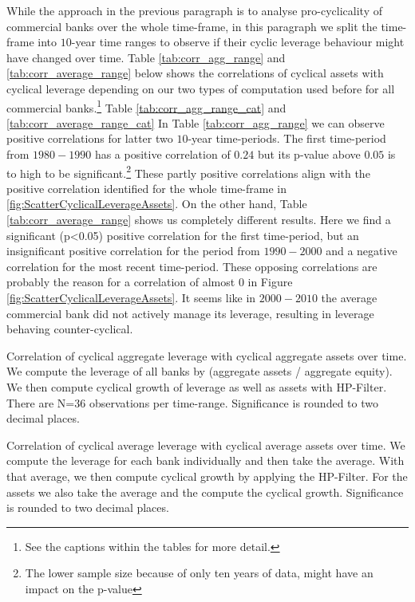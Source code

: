 \documentclass[12pt, a4paper]{article} %
\begin{document}
While the approach in the previous paragraph is to analyse pro-cyclicality of commercial banks over the whole time-frame, in this paragraph we split the time-frame into $10$-year time ranges to observe if their cyclic leverage behaviour might have changed over time. Table \ref{tab:corr_agg_range} and \ref{tab:corr_average_range} below shows the correlations of cyclical assets with cyclical leverage depending on our two types of computation used before for all commercial banks.\footnote{See the captions within the tables for more detail.} Table \ref{tab:corr_agg_range_cat} and \ref{tab:corr_average_range_cat} 
In Table \ref{tab:corr_agg_range} we can observe positive correlations for latter two $10$-year time-periods. The first time-period from $1980-1990$ has a positive correlation of $0.24$ but its p-value above $0.05$ is to high to be significant.\footnote{The lower sample size because of only ten years of data, might have an impact on the p-value} These partly positive correlations align with the positive correlation identified for the whole time-frame in \ref{fig:ScatterCyclicalLeverageAssets}.
On the other hand, Table \ref{tab:corr_average_range} shows us completely different results. Here we find a significant (p<0.05) positive correlation for the first time-period, but an insignificant positive correlation for the period from $1990-2000$ and a negative correlation for the most recent time-period. These opposing correlations are probably the reason for a correlation of almost $0$ in Figure \ref{fig:ScatterCyclicalLeverageAssets}. It seems like in $2000-2010$ the average commercial bank did not actively manage its leverage, resulting in leverage behaving counter-cyclical.


\begin{table}[H]
\begin{minipage}{\textwidth}

\caption[1]{Correlation of cyclical aggregate leverage with cyclical aggregate assets over time. We compute the leverage of all banks by (aggregate assets / aggregate equity). We then compute cyclical growth of leverage as well as assets with HP-Filter. There are N=$36$ observations per time-range. Significance is rounded to two decimal places.}
\label{tab:corr_agg_range}
\end{minipage}
\end{table}


\begin{table}[H]
\begin{minipage}{\textwidth}

\caption[1]{Correlation of cyclical average leverage with cyclical average assets over time. We compute the leverage for each bank individually and then take the average. With that average, we then compute cyclical growth by applying the HP-Filter. For the assets we also take the average and the compute the cyclical growth. Significance is rounded to two decimal places.}
\label{tab:corr_average_range}
\end{minipage}
\end{table}
\end{document}
